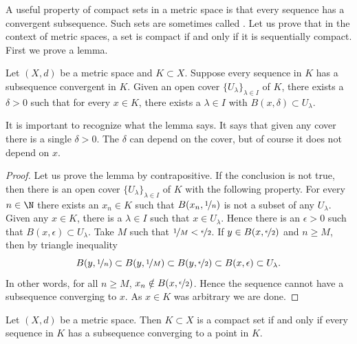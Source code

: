 \documentclass[12pt]{book}
\begin{document}
A useful property of compact sets in a metric space is that every
sequence has a convergent subsequence.
Such sets are sometimes called
\emph{}.
Let us prove that in the
context of metric spaces, a set is compact if and only if it is sequentially
compact.
First we prove a lemma.

\begin{lemma}\label{ms:lebesgue}
Let $(X,d)$ be a metric space and $K \subset X$.
Suppose 
every sequence in $K$ has a subsequence convergent in $K$.
Given
an open cover $\{ U_\lambda \}_{\lambda \in I}$ of $K$, there exists a
$\delta > 0$ such that for every $x \in K$, there exists a $\lambda \in I$
with $B(x,\delta) \subset U_\lambda$.
\end{lemma}

It is important to recognize what the lemma says.
It says that given any
cover there is a single $\delta > 0$.
The $\delta$ can depend on the cover,
but of course it does not depend on $x$.

\begin{proof}
Let us prove the lemma by contrapositive.
If the conclusion is not true, then
there is
an open cover $\{ U_\lambda \}_{\lambda \in I}$ of $K$ with
the following property.
For every $n \in \N$ there exists an $x_n \in K$ such that
$B(x_n,\nicefrac{1}{n})$ is not a subset of any $U_\lambda$.
Given any $x \in K$, there is
a $\lambda \in I$ such that $x \in U_\lambda$.
Hence there
is an $\epsilon > 0$ 
such that $B(x,\epsilon) \subset U_\lambda$.
Take $M$ such that
$\nicefrac{1}{M} < \nicefrac{\epsilon}{2}$.
If $y \in 
B(x,\nicefrac{\epsilon}{2})$ and $n \geq M$, then
by triangle inequality
\begin{equation*}
B(y,\nicefrac{1}{n}) \subset
B(y,\nicefrac{1}{M}) \subset B(y,\nicefrac{\epsilon}{2}) \subset
B(x,\epsilon) \subset U_\lambda .
\end{equation*}
In other words, for all $n \geq M$, $x_n \notin B(x,\nicefrac{\epsilon}{2})$. 
Hence the sequence cannot have a subsequence converging to $x$.
As $x \in K$ was
arbitrary we are done.
\end{proof}

\begin{thm} \label{thm:mscompactisseqcpt}
Let $(X,d)$ be a metric space.
Then $K \subset X$ is a compact set if
and only if every sequence in $K$ has a subsequence converging to
a point in $K$.
\end{thm}
\end{document}
